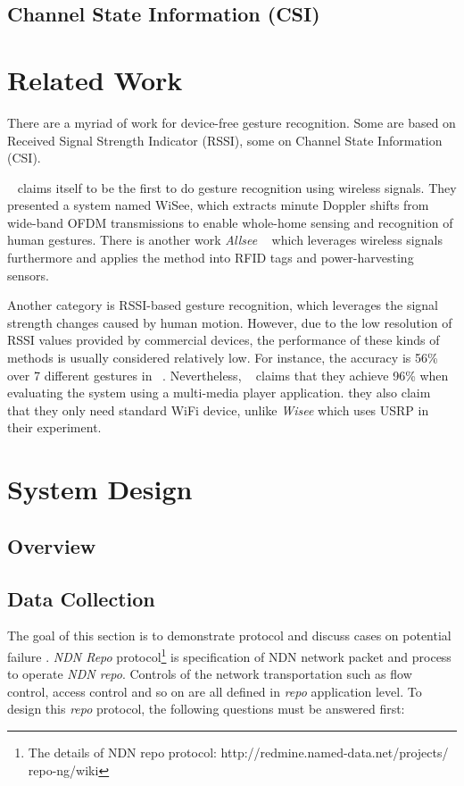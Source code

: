 \documentclass[conference]{IEEEtran}
\begin{document}
\subsection{Channel State Information (CSI)}



\section{Related Work}
There are a myriad of work for device-free gesture recognition. Some are based on Received Signal Strength Indicator (RSSI), some on Channel State Information (CSI).

~\cite{pu2013whole} claims itself to be the first to do gesture recognition using wireless signals. 
They presented a system named WiSee, which extracts minute Doppler shifts from wide-band OFDM transmissions to enable whole-home sensing and recognition of human gestures.
There is another work \emph{Allsee} ~\cite{kellogg2014bringing} which leverages wireless signals furthermore and applies the method into RFID tags and power-harvesting sensors.

Another category is RSSI-based gesture recognition, which leverages the signal strength changes caused by human motion.
However, due to the low resolution of RSSI values provided by commercial devices, the performance of these kinds of methods is usually considered relatively low.
For instance, the accuracy is 56\% over 7 different gestures in ~\cite{sigg2014telepathic}.
Nevertheless, ~\cite{abdelnasser2015wigest} claims that they achieve 96\% when evaluating the system using a multi-media player application.
they also claim that they only need standard WiFi device, unlike \emph{Wisee} which uses USRP in their experiment.
\section{System Design} \label{section-design}
\subsection{Overview}
\subsection{Data Collection}

The goal of this section is to demonstrate protocol and discuss cases on potential failure . \emph{NDN Repo} protocol\footnote{The details of NDN repo protocol: http://redmine.named-data.net/projects/
repo-ng/wiki} is specification of NDN network packet and process to operate \emph{NDN repo}. Controls of the network transportation such as flow control, access control and so on are all defined in \emph{repo} application level. To design this \emph{repo} protocol, the following questions must be answered first:
\end{document}
